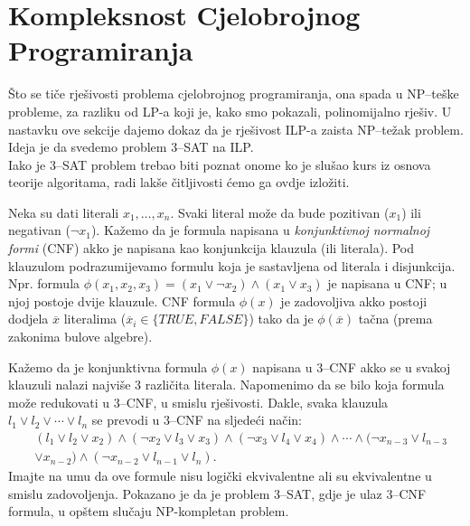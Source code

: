 \documentclass[a4paper, utf8, 11pt, colorlinks]{book}
\begin{document}
 \section{Kompleksnost Cjelobrojnog Programiranja}
   Što se tiče rješivosti problema cjelobrojnog programiranja, ona spada u NP--teške probleme, za razliku od LP-a koji je, kako smo pokazali, polinomijalno rješiv. U nastavku ove sekcije dajemo dokaz da je rješivost ILP-a zaista NP--težak problem.  Ideja je da  svedemo problem 3--SAT na ILP.\\ 
   Iako je 3--SAT problem trebao biti poznat onome ko je slušao kurs iz osnova teorije algoritama, radi lakše čitljivosti ćemo ga ovdje izložiti. 
   
   Neka su dati literali $x_1, \ldots, x_n$. Svaki literal može da bude pozitivan ($x_1$) ili negativan  ($\neg x_1$). Kažemo da je formula napisana u \emph{konjunktivnoj normalnoj formi} (CNF) akko je napisana kao konjunkcija klauzula (ili literala). Pod klauzulom podrazumijevamo formulu koja je sastavljena od literala i disjunkcija. Npr. formula $\phi(x_1, x_2, x_3)= (x_1 \vee  \neg x_2) \wedge (x_1 \vee x_3)$ je napisana u CNF; u njoj postoje dvije klauzule. CNF formula $\phi(x)$ je zadovoljiva akko postoji dodjela $\overline{x}$ literalima ($\overline{x}_i \in \{TRUE, FALSE\}$) tako da je $\phi(\overline{x})$ tačna (prema zakonima bulove algebre).  
   
   Kažemo da je konjunktivna formula $\phi(x)$  napisana u 3--CNF  akko se u svakoj klauzuli nalazi najviše 3 različita literala. Napomenimo da se bilo koja formula može redukovati u 3--CNF, u smislu rješivosti. Dakle, svaka klauzula 
   $l_1 \vee l_2 \vee \cdots \vee l_n$ se prevodi u 3--CNF na sljedeći način:
   \begin{align*}
       &(l_1 \vee l_2 \vee x_2) \wedge ( \neg x_2 \vee l_3 \vee x_3) \wedge ( \neg x_3 \vee l_4 \vee x_4 ) \wedge \cdots \wedge (\neg x_{n-3} \vee l_{n-3} \\
       &\vee x_{n-2} ) \wedge ( \neg x_{n-2} \vee l_{n-1} \vee l_n ).  
    \end{align*}    
      Imajte na umu da ove formule nisu logički ekvivalentne ali su ekvivalentne u smislu zadovoljenja. 
    Pokazano je da je problem 3--SAT, gdje je ulaz 3--CNF formula,  u opštem slučaju NP-kompletan problem.  
    
\end{document}
